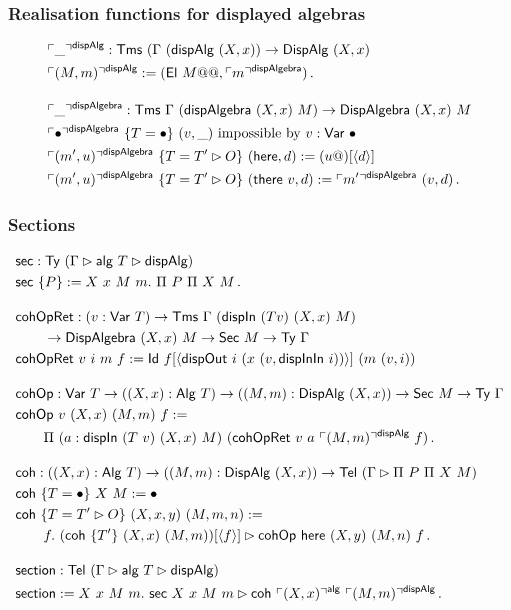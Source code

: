 \subsubsection{Realisation functions for displayed algebras}

\begin{align*}
&\emb{\_}^{\mta{dispAlg}} : \Tms\ (\Gamma \ (\mta{dispAlg}\ (X, x)) \to \mta{DispAlg}\ (X, x) \\
&\emb{(M, m)}^{\mta{dispAlg}} := (\mta{El}\ M@@, \emb{m}^{\mta{dispAlgebra}}) \,. \\[1em]
&\emb{\_}^{\mta{dispAlgebra}} : \Tms\ \Gamma \ (\mta{dispAlgebra}\ (X, x)\ M) \to \mta{DispAlgebra}\ (X, x)\ M \\
&\emb{\bullet}^{\mta{dispAlgebra}}\ \{T = \bullet\}\ (v, \_)\text{ impossible by $v : \mta{Var}\ \bullet$} \\
&\emb{(m', u)}^{\mta{dispAlgebra}}\ \{T = T' \rhd O\}\ (\mta{here}, d) := (u@)[\Msub{d}] \\
&\emb{(m', u)}^{\mta{dispAlgebra}}\ \{T = T' \rhd O\}\ (\mta{there}\ v, d) := \emb{m'}^{\mta{dispAlgebra}}\ (v, d) \,.
\end{align*}

\subsubsection{Sections}

\begin{align*}
&\mta{sec} : \Ty\ (\Gamma \rhd \mta{alg}\ T \rhd \mta{dispAlg})  \\
&\mta{sec}\ \{P\} := X\ x\ M\ m.\ \Pi\ P\ \Pi\ X\ M \,. \\[1em]
&\mta{cohOpRet} : (v : \mta{Var}\ T) \to \Tms\ \Gamma\ (\mta{dispIn}\ (T v)\ (X, x)\ M) \\ &\qquad \to \mta{DispAlgebra}\ (X, x)\ M \to \mta{Sec}\ M \to \Ty\ \Gamma \\
&\mta{cohOpRet}\ v\ i\ m\ f := \mta{Id}\ f[\Msub{\mta{dispOut}\ i\ (x\ (v,\mta{dispInIn}\ i))}]\ (m\ (v, i)) \\[1em]
&\mta{cohOp} : \mta{Var}\ T \to ((X, x) : \mta{Alg}\ T) \to ((M, m) : \mta{DispAlg}\ (X, x)) \to \mta{Sec}\ M \to \Ty\ \Gamma \\
&\mta{cohOp}\ v\ (X, x)\ (M, m)\ f := \\ & \qquad \Pi\ (a : \mta{dispIn}\ (T\ v)\ (X, x)\ M)\ (\mta{cohOpRet}\ v\ a\ \emb{(M, m)}^{\mta{dispAlg}}\ f)\, . \\[1em]
&\mta{coh} : ((X, x) : \mta{Alg}\ T) \to ((M, m) : \mta{DispAlg}\ (X, x)) \to \Tel\ (\Gamma \rhd \Pi\ P\ \Pi\ X\ M) \\
&\mta{coh}\ \{T = \bullet\}\ X\ M := \bullet \\
&\mta{coh}\ \{T = T' \rhd O\}\ (X, x, y)\ (M, m, n) := \\ & \qquad f.\ (\mta{coh}\ \{T'\}\ (X, x)\ (M, m))[\Msub{f}] \rhd \mta{cohOp}\ \mta{here}\ (X, y)\ (M, n)\ f \,. \\[1em]
&\mta{section} : \Tel\ (\Gamma \rhd \mta{alg}\ T \rhd \mta{dispAlg}) \\
&\mta{section} := X\ x\ M\ m.\ \mta{sec}\ X\ x\ M\ m \rhd \mta{coh}\ \emb{(X, x)}^{\mta{alg}}\ \emb{(M, m)}^{\mta{dispAlg}} \,.
\end{align*}

